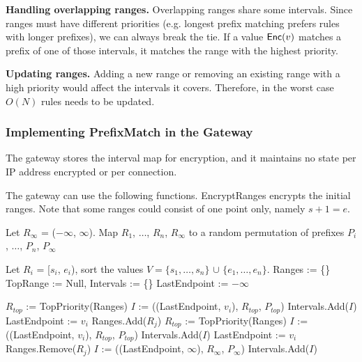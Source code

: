 \noindent \textbf{Handling overlapping ranges.} 
Overlapping ranges share some intervals. Since ranges must have different priorities (e.g. longest prefix matching prefers rules with longer prefixes), we can always break the tie. If a value $\mathsf{Enc}(v)$ matches a prefix of one of those intervals, it matches the range with the highest priority.

\noindent \textbf{Updating ranges.}
Adding a new range or removing an existing range with a high priority would affect the intervals it covers. Therefore, in the worst case $O(N)$ rules needs to be updated. 

\subsubsection{Implementing PrefixMatch in the Gateway}
\label{sec:tree}

The gateway stores the interval map for encryption, and it maintains no state per IP address encrypted or per connection.

The gateway can use the following functions. EncryptRanges encrypts the initial ranges. Note that some ranges could consist of
one point only, namely $s + 1 = e$. 


\begin{framed}
\begin{algorithmic}[1]

  \State Let $R_{\infty}$ = ($-\infty$, $\infty$).
  \State Map $R_1$, $\dots$, $R_n$, $R_{\infty}$ to a random permutation of prefixes $P_i$, $\dots$, $P_n$, $P_{\infty}$
  
  \State Let $R_i$ = [$s_i$, $e_i$), sort the values 
              $V = \{s_1, \dots, s_n\}$ 
              $\cup$ $\{e_1, \dots, e_n\}$.
  \State Ranges := \{\}
  \State TopRange := Null, 
  \State Intervals := \{\}
  \State LastEndpoint := $-\infty$
    
      \State $R_{top}$ := TopPriority(Ranges)
        \State $I$ := ((LastEndpoint, $v_i$), $R_{top}$, $P_{top}$)
        \State Intervals.Add($I$)
        \State LastEndpoint := $v_i$
      \EndIf
      \State Ranges.Add($R_j$) 
    \Else
      \State $R_{top}$ := TopPriority(Ranges)
        \State $I$ := ((LastEndpoint, $v_i$), $R_{top}$, $P_{top}$)
        \State Intervals.Add($I$)
        \State LastEndpoint := $v_i$
      \EndIf
      \State Ranges.Remove($R_j$)
    \EndIf
  \EndFor
  \State $I$ := ((LastEndpoint, $\infty$), $R_{\infty}$, $P_{\infty}$)
  \State Intervals.Add($I$)
  \State {}
\EndProcedure

\end{algorithmic}
\end{framed}

